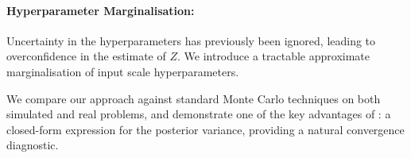 \documentclass{article}
\begin{document}
\paragraph*{Hyperparameter Marginalisation:} Uncertainty in the hyperparameters has previously been ignored, leading to overconfidence in the estimate of $Z$.  We introduce a tractable approximate marginalisation of input scale hyperparameters.


We compare our  approach against standard Monte Carlo techniques on both simulated and real problems, and demonstrate one of the key advantages of : a closed-form expression for the posterior variance, providing a natural convergence diagnostic. 





\end{document}
